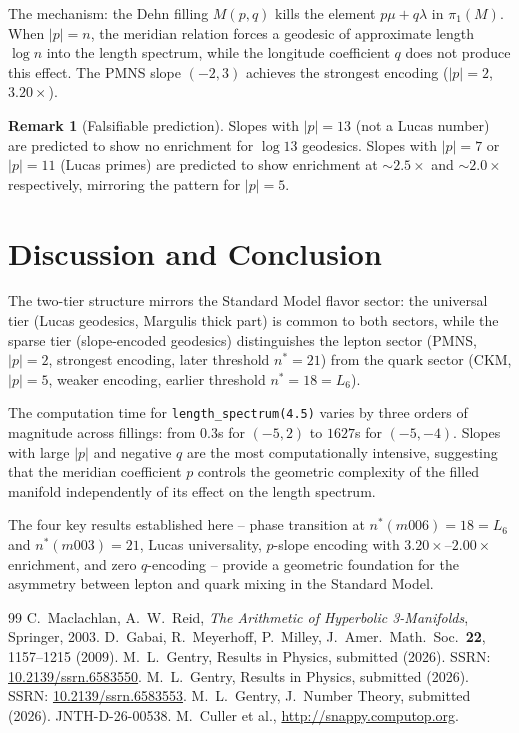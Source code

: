 \documentclass[12pt]{article}
\theoremstyle{definition}
\newtheorem{remark}[theorem]{Remark}
\begin{document}
The mechanism: the Dehn filling $M(p,q)$ kills the element
$p\mu + q\lambda$ in $\pi_1(M)$. When $|p|=n$, the meridian
relation forces a geodesic of approximate length $\log n$ into
the length spectrum, while the longitude coefficient $q$ does not
produce this effect. The PMNS slope $(-2,3)$ achieves the strongest
encoding ($|p|=2$, $3.20\times$).

\begin{remark}[Falsifiable prediction]
Slopes with $|p|=13$ (not a Lucas number) are predicted to show no
enrichment for $\log 13$ geodesics. Slopes with $|p|=7$ or $|p|=11$
(Lucas primes) are predicted to show enrichment at
$\sim 2.5\times$ and $\sim 2.0\times$ respectively, mirroring the
pattern for $|p|=5$.
\end{remark}

\section{Discussion and Conclusion}

The two-tier structure mirrors the Standard Model flavor sector:
the universal tier (Lucas geodesics, Margulis thick part) is common
to both sectors, while the sparse tier (slope-encoded geodesics)
distinguishes the lepton sector (PMNS, $|p|=2$, strongest encoding,
later threshold $n^*=21$) from the quark sector (CKM, $|p|=5$,
weaker encoding, earlier threshold $n^*=18=L_6$).

The computation time for \texttt{length\_spectrum(4.5)} varies by
three orders of magnitude across fillings: from $0.3$s for
$(-5,2)$ to $1627$s for $(-5,-4)$. Slopes with large $|p|$ and
negative $q$ are the most computationally intensive, suggesting
that the meridian coefficient $p$ controls the geometric complexity
of the filled manifold independently of its effect on the length
spectrum.

The four key results established here -- phase transition at
$n^*(m006)=18=L_6$ and $n^*(m003)=21$, Lucas universality,
$p$-slope encoding with $3.20\times$--$2.00\times$ enrichment, and
zero $q$-encoding -- provide a geometric foundation for the
asymmetry between lepton and quark mixing in the Standard Model.

\begin{thebibliography}{99}
C.~Maclachlan, A.~W.~Reid,
\textit{The Arithmetic of Hyperbolic 3-Manifolds}, Springer, 2003.
D.~Gabai, R.~Meyerhoff, P.~Milley,
J.\ Amer.\ Math.\ Soc.\ \textbf{22}, 1157--1215 (2009).
M.~L.~Gentry, Results in Physics, submitted (2026).
SSRN: \href{https://doi.org/10.2139/ssrn.6583550}{10.2139/ssrn.6583550}.
M.~L.~Gentry, Results in Physics, submitted (2026).
SSRN: \href{https://doi.org/10.2139/ssrn.6583553}{10.2139/ssrn.6583553}.
M.~L.~Gentry, J.\ Number Theory, submitted (2026).
JNTH-D-26-00538.
M.~Culler et al., \url{http://snappy.computop.org}.
\end{thebibliography}
\end{document}
